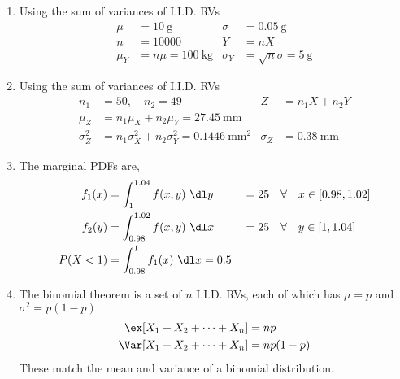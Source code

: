 \begin{enumerate}
    \item Using the sum of variances of I.I.D. RVs
          \begin{align}
              \mu      & = \SI{10}{\g}                  &
              \sigma   & = \SI{0.05}{\g}                  \\
              n        & = 10000                        &
              Y        & = nX                             \\
              \mu_Y    & = n\mu = \SI{100}{\kg}         &
              \sigma_Y & = \sqrt{n} \sigma = \SI{5}{\g}
          \end{align}

    \item Using the sum of variances of I.I.D. RVs
          \begin{align}
              n_1                        & = 50, \quad n_2 = 49                    &
              Z                          & = n_1X + n_2Y                             \\
              \mu_Z                      & = n_1\mu_X + n_2\mu_Y = \SI{27.45}{\mm}   \\
              \sigma^2_Z                 & = n_1 \sigma^2_X + n_2 \sigma^2_Y
              = \SI{0.1446}{\mm\squared} &
              \sigma_Z                   & = \SI{0.38}{\mm}
          \end{align}

    \item The marginal PDFs are,
          \begin{align}
              f_1(x) & = \int_{1}^{1.04} f(x,y)\ \dl y            &
                     & = 25 \quad \forall \quad x \in [0.98,1.02]   \\
              f_2(y) & = \int_{0.98}^{1.02} f(x,y)\ \dl x         &
                     & = 25 \quad \forall \quad y \in [1,1.04]      \\
              P(X<1) & = \int_{0.98}^{1} f_1(x)\ \dl x = 0.5
          \end{align}

    \item The binomial theorem is a set of $ n $ I.I.D. RVs, each of which has
          $ \mu = p $ and $ \sigma^2 = p(1-p) $
          \begin{align}
              \ex[X_1 + X_2 + \dots + X_n]  & = np      \\
              \Var[X_1 + X_2 + \dots + X_n] & = np(1-p)
          \end{align}
          These match the mean and variance of a binomial distribution.


\end{enumerate}
